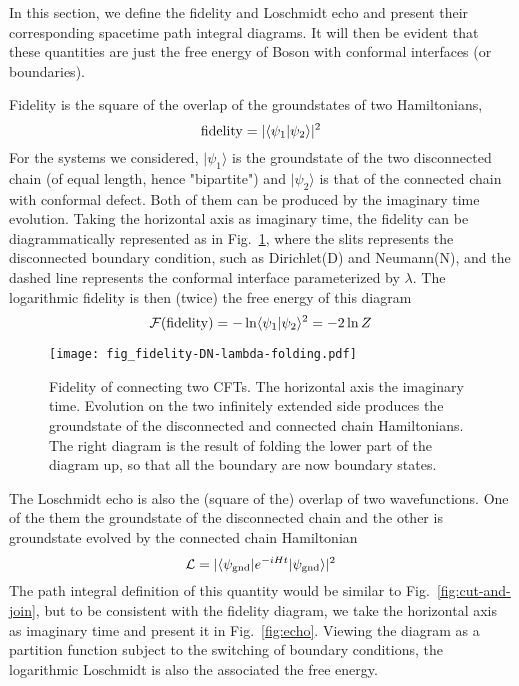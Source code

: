 
In this section, we define the fidelity and Loschmidt echo and present their corresponding spacetime path integral diagrams. It will then be evident that these quantities are just the free energy of Boson with conformal interfaces (or boundaries). 

Fidelity is the square of the overlap of the groundstates of two Hamiltonians, 
\begin{equation}
{\rm fidelity} = |\langle \psi_1 |\psi_2  \rangle |^2 
\end{equation}
For the systems we considered, $|\psi_1 \rangle$ is the groundstate of the two disconnected chain (of equal length, hence "bipartite") and $|\psi_2\rangle$ is that of the connected chain with conformal defect. Both of them can be produced by the imaginary time evolution. Taking the horizontal axis as imaginary time, the fidelity can be diagrammatically represented as in Fig.~\ref{fig:fidel}, where the slits represents the disconnected boundary condition, such as Dirichlet(D) and Neumann(N), and the dashed line represents the conformal interface parameterized by $\lambda$. The logarithmic fidelity is then (twice) the free energy of this diagram
\begin{equation}
\mathcal{F}( {\rm fidelity} )  = - \ln \langle \psi_1 |\psi_2 \rangle^2 = - 2 \ln Z
\end{equation}

\begin{figure}[h]
\centering
\texttt{[image: fig\_fidelity-DN-lambda-folding.pdf]}
\caption{Fidelity of connecting two CFTs. The horizontal axis the imaginary time. Evolution on the two infinitely extended side produces the groundstate of the disconnected and connected chain Hamiltonians. The right diagram is the result of folding the lower part of the diagram up, so that all the boundary are now boundary states.}
\label{fig:fidel}
\end{figure}


The Loschmidt echo is also the (square of the) overlap of two wavefunctions. One of the them the groundstate of the disconnected chain and the other is groundstate evolved by the connected chain Hamiltonian
\begin{equation}
\mathcal{L} = |\langle \psi_{\rm gnd}  | e^{-i H t } | \psi_{\rm gnd} \rangle|^2
\end{equation}
The path integral definition of this quantity would be similar to Fig.~\ref{fig:cut-and-join}, but to be consistent with the fidelity diagram, we take the horizontal axis as imaginary time and present it in Fig.~\ref{fig:echo}. Viewing the diagram as a partition function subject to the switching of boundary conditions, the logarithmic Loschmidt is also the associated the free energy.

